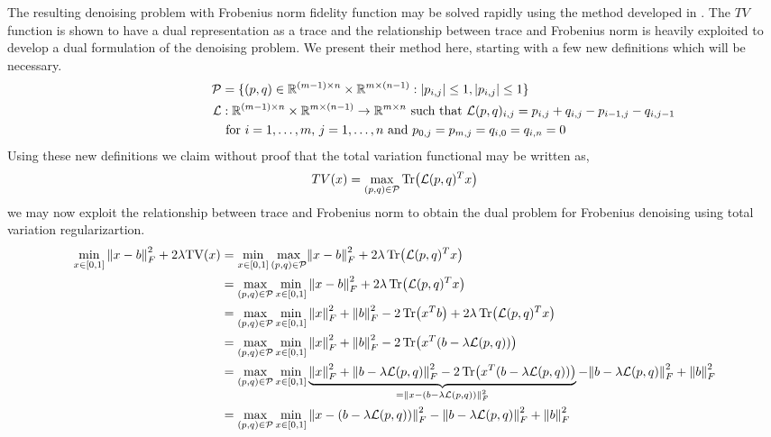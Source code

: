 \documentclass[10pt,a4paper]{article}
\newcommand{\R}{\mathbb{R}}
\begin{document}
	The resulting denoising problem with Frobenius norm fidelity function may be solved rapidly using the method developed in \cite{TV}.  The $TV$ function is shown to have a dual representation as a trace and the relationship between trace and Frobenius norm is heavily exploited to develop a dual formulation of the denoising problem.  We present their method here, starting with a few new definitions which will be necessary.
	\begin{align*}
	\mathcal{P} &= \{ (p,q) \in \R^{(m-1) \times n} \times \R^{ m \times (n-1) } :  \abs{p_{i,j} } \le 1, \abs{p_{ i,j } } \le 1 \} \\
	\mathcal{L} &: \R^{(m-1) \times n} \times \R^{ m \times (n-1) } \rightarrow \R^{m \times n}  \text{ such that } \mathcal{L}(p,q)_{i,j} = p_{i,j} + q_{i,j} - p_{ i-1,j } - q_{ i,j-1 }\\ \hspace{3 cm}& \text{ for } i = 1,\dots,m,\,j = 1,\dots,n \text{ and }  p_{0,j} = p_{m,j} = q_{i,0} = q_{i,n} = 0\\
	\end{align*}
	Using these new definitions we claim without proof that the total variation functional may be written as,
	\begin{equation}
	TV(x) = \underset{(p,q) \in \mathcal{P}}{\max} \Tr(\mathcal{L}(p,q)^Tx)
	\end{equation}
	we may now exploit the relationship between trace and Frobenius norm to obtain the dual problem for Frobenius denoising using total variation regularizartion.  
	\begin{align*}
	\min_{x \in [0,1]} \norm{x-b}_F^2 +2 \lambda \mathrm{TV}(x) &= \min_{x \in [0,1]}  \underset{(p,q) \in \mathcal{P}}{\max}  \norm{x-b}_F^2 + 2\lambda \Tr(\mathcal{L}(p,q)^Tx) \\
	&= \underset{(p,q) \in \mathcal{P}}{\max}   \min_{x \in [0,1]} \norm{x-b}_F^2 +2 \lambda \Tr(\mathcal{L}(p,q)^Tx) \\
	&=\underset{(p,q) \in \mathcal{P}}{\max}   \min_{x \in [0,1]} \norm{x}_F^2 + \norm{b}_F^2 - 2 \Tr(x^Tb)+ 2\lambda \Tr(\mathcal{L}(p,q)^Tx) \\
	&=\underset{(p,q) \in \mathcal{P}}{\max}   \min_{x \in [0,1]} \norm{x}_F^2 + \norm{b}_F^2 - 2 \Tr(x^T(b- \lambda\mathcal{L}(p,q)))\\
	&=\underset{(p,q) \in \mathcal{P}}{\max}   \min_{x \in [0,1]} \underbrace{\norm{x}_F^2 + \norm{b- \lambda\mathcal{L}(p,q)}_F^2 - 2 \Tr(x^T(b- \lambda\mathcal{L}(p,q)))}_{ = \norm{x-(b- \lambda\mathcal{L}(p,q))}_F^2} -  \norm{b- \lambda\mathcal{L}(p,q)}_F^2+ \norm{b}_F^2\\
	&= \underset{(p,q) \in \mathcal{P}}{\max}   \min_{x \in [0,1]}  \norm{x-(b- \lambda\mathcal{L}(p,q))}_F^2 - \norm{b- \lambda\mathcal{L}(p,q)}_F^2+ \norm{b}_F^2
	\end{align*}
\end{document}
